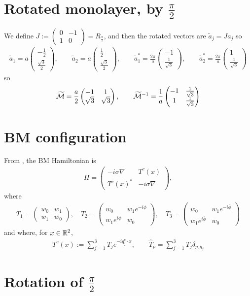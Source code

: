 \documentclass[11pt,a4paper,reqno,french,tikz]{amsart}
\newcommand{\na}{\nabla} %
\newcommand{\f}[2]{\frac{#1}{#2}} %
\newcommand{\mat}[1]{\begin{pmatrix} #1 \end{pmatrix}} %
\begin{document}
\section{Rotated monolayer, by $\f{\pi}2$}%
\label{sec:rotated_monolayer_by_pi2_}
We define $J := \mat{0 & -1 \\ 1 & 0} = R_{\f{\pi}2}$, and then the rotated vectors are $\widetilde{a}_j = J a_j$ so
\begin{align*}
	\widetilde{a}_1 = a \mat{-\f 12 \\ \f{\sqrt{3}}{2}}, \qquad \widetilde{a}_2 = a \mat{\f 12 \\ \f{\sqrt{3}}{2}}, \qquad \widetilde{a}_1^* =\f{2\pi}{a} \mat{-1 \\ \f{1}{\sqrt 3}}, \qquad \widetilde{a}_2^* =\f{2\pi}{a} \mat{1 \\ \f{1}{\sqrt 3}}
\end{align*}
so
\begin{align*}
	\widetilde{\cM} =  \f a2 \mat{-1 & 1 \\ \sqrt 3 & \sqrt 3}, \qquad  \widetilde{\cM}^{-1} = \f 1a \mat{-1 & \f{1}{\sqrt 3} \\ 1 & \f{1}{\sqrt 3}}
\end{align*}

\section{BM configuration}%
\label{sec:bm_configuration}


From \cite{BecEmbWitZwo21}, the BM Hamiltonian is
\begin{align*}
	H = \mat{-i\sigma \na & T^c(x) \\ T^c(x)^* & -i \sigma \na},
\end{align*}
where
\begin{align*}
\boxed{T_1 = \mat{w_0 & w_1 \\ w_1 & w_0}, \quad  T_2 = \mat{w_0 &  w_1e^{-i\phi} \\  w_1e^{i\phi} & w_0}, \quad T_3 = \mat{w_0 &  w_1e^{-i\overline{\phi}} \\  w_1e^{i\overline{\phi}} & w_0}}
\end{align*}
and where, for $x \in \mathbb{R}^2$,
\begin{align*}
T^c(x) := \sum_{j=1}^3 T_j e^{-iq^c_j \cdot x}, \qquad \widehat{T}_p = \sum_{j=1}^{3} T_j \delta_{p,q_j}
\end{align*}

\section{Rotation of $\f{\pi}2$}%
\label{sec:rotation_of_q_}
\end{document}
